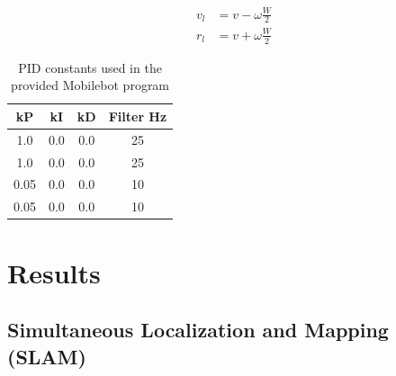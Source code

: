 \documentclass[journal]{IEEEtran}
\begin{document}
        \begin{equation} \label{eq:wheel_speeds}
            \begin{split}
                v_l &= v - \omega\frac{W}{2} \\
                r_l &= v + \omega\frac{W}{2}
            \end{split}
        \end{equation}
        
        \begin{table}[b!]
            \centering
            \begin{tabular}{|c|c|c|c|} \hline
                kP & kI & kD & Filter Hz \\ \hline
                1.0 & 0.0 & 0.0 & 25 \\ \hline
                1.0 & 0.0 & 0.0 & 25 \\ \hline
                0.05 & 0.0 & 0.0 & 10 \\ \hline
                0.05 & 0.0 & 0.0 & 10 \\ \hline
            \end{tabular}
            \caption{PID constants used in the provided Mobilebot program}
            \label{tab:pid}
        \end{table}
    
\section{Results}

    \subsection{Simultaneous Localization and Mapping (SLAM)}
    
\end{document}

